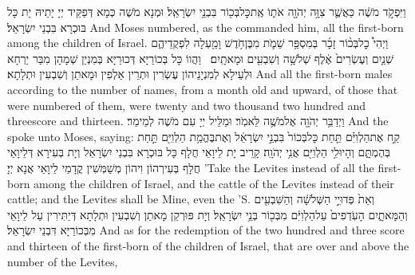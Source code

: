 {וַיִּפְקֹ֣ד מֹשֶׁ֔ה כַּאֲשֶׁ֛ר צִוָּ֥ה יְהֹוָ֖ה אֹת֑וֹ אֶֽת\maqqaf כׇּל\maqqaf בְּכ֖וֹר בִּבְנֵ֥י יִשְׂרָאֵֽל׃}
{וּמְנָא מֹשֶׁה כְּמָא דְּפַקֵּיד יְיָ יָתֵיהּ יָת כָּל בּוּכְרָא בִּבְנֵי יִשְׂרָאֵל׃}
{And Moses numbered, as the \lord\space commanded him, all the first-born among the children of Israel.}{}
{וַיְהִי֩ כׇל\maqqaf בְּכ֨וֹר זָכָ֜ר בְּמִסְפַּ֥ר שֵׁמֹ֛ת מִבֶּן\maqqaf חֹ֥דֶשׁ וָמַ֖עְלָה לִפְקֻדֵיהֶ֑ם שְׁנַ֤יִם וְעֶשְׂרִים֙ אֶ֔לֶף שְׁלֹשָׁ֥ה וְשִׁבְעִ֖ים וּמָאתָֽיִם׃ \petucha }
{וַהֲווֹ כָּל בְּכוֹרַיָּא דְּכוּרַיָּא בְּמִנְיַן שְׁמָהָן מִבַּר יַרְחָא וּלְעֵילָא לְמִנְיָנֵיהוֹן עֶשְׂרִין וּתְרֵין אַלְפִין וּמָאתַן וְשִׁבְעִין וּתְלָתָא׃}
{And all the first-born males according to the number of names, from a month old and upward, of those that were numbered of them, were twenty and two thousand two hundred and threescore and thirteen.}{}
{וַיְדַבֵּ֥ר יְהֹוָ֖ה אֶל\maqqaf מֹשֶׁ֥ה לֵּאמֹֽר׃}
{וּמַלֵּיל יְיָ עִם מֹשֶׁה לְמֵימַר׃}
{And the \lord\space spoke unto Moses, saying:}{}
{קַ֣ח אֶת\maqqaf הַלְוִיִּ֗ם תַּ֤חַת כׇּל\maqqaf בְּכוֹר֙ בִּבְנֵ֣י יִשְׂרָאֵ֔ל וְאֶת\maqqaf בֶּהֱמַ֥ת הַלְוִיִּ֖ם תַּ֣חַת בְּהֶמְתָּ֑ם וְהָיוּ\maqqaf לִ֥י הַלְוִיִּ֖ם אֲנִ֥י יְהֹוָֽה׃}
{קָרֵיב יָת לֵיוָאֵי חֲלָף כָּל בּוּכְרָא בִּבְנֵי יִשְׂרָאֵל וְיָת בְּעִירָא דְּלֵיוָאֵי חֲלָף בְּעִירְהוֹן וִיהוֹן מְשַׁמְּשִׁין קֳדָמַי לֵיוָאֵי אֲנָא יְיָ׃}
{’Take the Levites instead of all the first-born among the children of Israel, and the cattle of the Levites instead of their cattle; and the Levites shall be Mine, even the \lord’S.}{}
{וְאֵת֙ פְּדוּיֵ֣י הַשְּׁלֹשָׁ֔ה וְהַשִּׁבְעִ֖ים וְהַמָּאתָ֑יִם הָעֹֽדְפִים֙ עַל\maqqaf הַלְוִיִּ֔ם מִבְּכ֖וֹר בְּנֵ֥י יִשְׂרָאֵֽל׃}
{וְיָת פּוּרְקַן מָאתַן וְשִׁבְעִין וּתְלָתָא דְּיַתִּירִין עַל לֵיוָאֵי מִבְּכוֹרַיָּא דִּבְנֵי יִשְׂרָאֵל׃}
{And as for the redemption of the two hundred and three score and thirteen of the first-born of the children of Israel, that are over and above the number of the Levites,}{}
